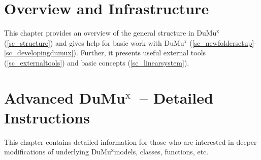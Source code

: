 \documentclass[11pt,a4paper,headinclude,footinclude,DIV16]{scrreprt}
\newcommand{\Dumux}{\texorpdfstring{Du\-Mu$^\text{x}$\xspace}{DuMuX\xspace}}
\begin{document}
\chapter{Overview and Infrastructure}
This chapter provides an overview of the general structure in \Dumux (\ref{sc_structure})
and gives help for basic work with \Dumux
(\ref{sc_newfoldersetup}-\ref{sc_developingdumux}).
Further, it presents useful external tools (\ref{sc_externaltools}) and basic
concepts (\ref{sc_linearsystem}).









\chapter{Advanced \Dumux\ -- Detailed Instructions}
This chapter contains detailed information for those who are interested
in deeper modifications of underlying \Dumux models, classes, functions, etc.










\end{document}
